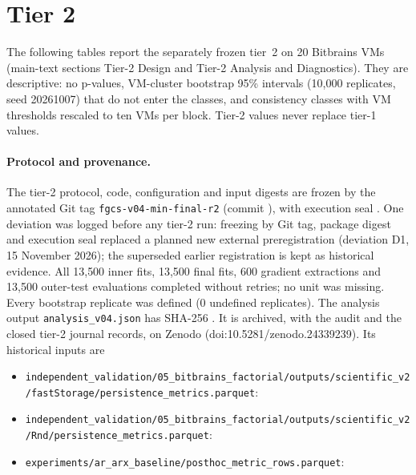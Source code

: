 \documentclass[a4paper,11pt]{article}
\begin{document}
\section*{Tier 2}
The following tables report the separately frozen tier~2 on 20 Bitbrains VMs (main-text sections Tier-2 Design and Tier-2 Analysis and Diagnostics). They are descriptive: no p-values, VM-cluster bootstrap 95\% intervals (10{,}000 replicates, seed 20261007) that do not enter the classes, and consistency classes with VM thresholds rescaled to ten VMs per block. Tier-2 values never replace tier-1 values.

\paragraph{Protocol and provenance.} The tier-2 protocol, code, configuration and input digests are frozen by the annotated Git tag \texttt{fgcs-v04-min-final-r2} (commit \texttt{}), with execution seal \texttt{}. One deviation was logged before any tier-2 run: freezing by Git tag, package digest and execution seal replaced a planned new external preregistration (deviation D1, 15 November 2026); the superseded earlier registration is kept as historical evidence. All 13{,}500 inner fits, 13{,}500 final fits, 600 gradient extractions and 13{,}500 outer-test evaluations completed without retries; no unit was missing. Every bootstrap replicate was defined (0 undefined replicates). The analysis output \texttt{analysis\_v04.json} has SHA-256 \texttt{}. It is archived, with the audit and the closed tier-2 journal records, on Zenodo (doi:10.5281/zenodo.24339239). Its historical inputs are
\begin{itemize}\footnotesize\raggedright
\item \nolinkurl{independent_validation/05_bitbrains_factorial/outputs/scientific_v2/fastStorage/persistence_metrics.parquet}:\\ \texttt{}
\item \nolinkurl{independent_validation/05_bitbrains_factorial/outputs/scientific_v2/Rnd/persistence_metrics.parquet}:\\ \texttt{}
\item \nolinkurl{experiments/ar_arx_baseline/posthoc_metric_rows.parquet}:\\ \texttt{}
\end{itemize}
\end{document}
